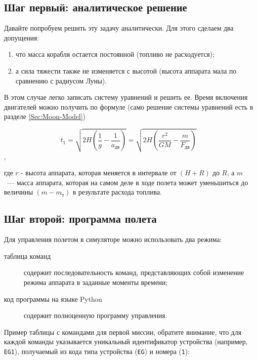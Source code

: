 \documentclass[12pt,a4paper]{article}
\begin{document}
\subsection{Шаг первый: аналитическое решение}

Давайте попробуем решить эту задачу аналитически. Для этого сделаем два допущения:

\begin{enumerate}
\item что масса корабля остается постоянной (топливо не расходуется);
\item а сила тяжести также не изменяется с высотой (высота аппарата мала по сравнению с
  радиусом Луны).
\end{enumerate}

В этом случае легко записать систему уравнений и решить ее. Время включения двигателей
можно получить по формуле (само решение системы уравнений есть в разделе \ref{Sec:Moon-Model})

$$ t_1 = \sqrt{2 H \left(\frac{1}{g} - \frac{1}{a_{\text{дв}}}\right)} =
\sqrt{2 H \left(\frac{r^2}{G M} - \frac{m}{F_{\text{дв}}}\right)} $$,

где $r$ - высота аппарата, которая меняется в интервале от $(H + R)$ до $R$, а $m$~---
масса аппарата, которая на самом деле в ходе полета может уменьшиться до величины $(m -
m_{\text{т}})$ в результате расхода топлива.

\hfill

\noindent{}

\subsection{Шаг второй: программа полета}

Для управления полетом в симуляторе можно использовать два режима:

\begin{description}
\item[таблица команд] содержит последовательность команд, представляющих собой изменение
  режима аппарата в заданные моменты времени;
\item[код программы на языке Python] содержит полноценную программу управления.
\end{description}  

Пример таблицы с командами для первой миссии, обратите внимание, что для каждой команды
указывается уникальный идентификатор устройства (например, \verb'EG1'), получаемый из кода
типа устройства (\verb'EG') и номера (\verb'1'):
\end{document}
